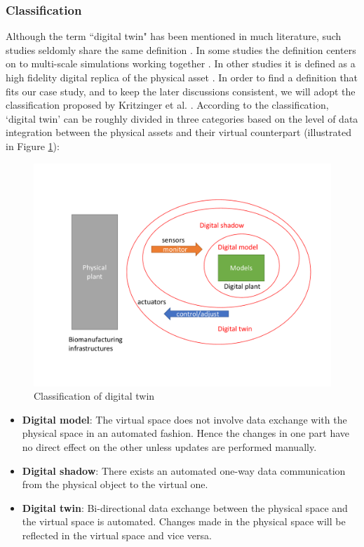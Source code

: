 \subsubsection{Classification}
Although the term ``digital twin" has been mentioned in much literature, such studies seldomly share the same definition \cite{Liu2021}. In some studies the definition centers on to multi-scale simulations working together \cite{Shafto2012}. In other studies it is defined as a high fidelity digital replica of the physical asset \cite{Schluse2018}. In order to find a definition that fits our case study, and to keep the later discussions consistent, we will adopt the classification proposed by Kritzinger et al. \cite{Kritzinger2018}. According to the classification, `digital twin' can be roughly divided in three categories based on the level of data integration between the physical assets and their virtual counterpart (illustrated in Figure \ref{fig:dt}):

\begin{figure}[hbt!]
  \centering
  \includegraphics[scale=0.5]{figures/dt.pdf}
  \caption{Classification of digital twin}
  \label{fig:dt}
\end{figure}

\begin{itemize}

  \item \textbf{Digital model}: The virtual space does not involve data exchange with the physical space in an automated fashion. Hence the changes in one part have no direct effect on the other unless updates are performed manually.

  \item \textbf{Digital shadow}: There exists an automated one-way data communication from the physical object to the virtual one.
  
  \item \textbf{Digital twin}: Bi-directional data exchange between the physical space and the virtual space is automated. Changes made in the physical space will be reflected in the virtual space and vice versa. 

\end{itemize}

